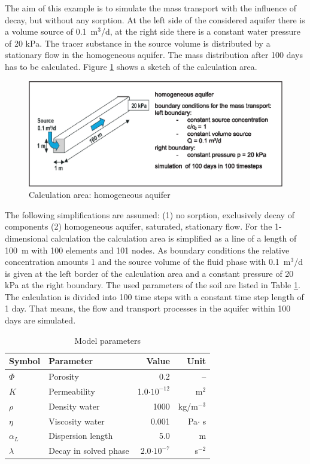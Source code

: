 The aim of this example is to simulate the mass transport with the influence of decay, but without any sorption. At the left side of the considered aquifer there is a volume source of 0.1~m$^3$/d, at the right side there is a constant water pressure of 20 kPa. The tracer substance in the source volume is distributed by a stationary flow in the homogeneous aquifer. The mass distribution after 100 days has to be calculated. Figure \ref{fig51} shows a sketch of the calculation area.

\begin{figure}[htbp]
\centering
\includegraphics[width=1.0\textwidth]{PART_II/C/fig51.eps}
\caption{Calculation area: homogeneous aquifer}
\label{fig51}
\end{figure}

The following simplifications are assumed: (1) no sorption, exclusively decay of components (2) homogeneous aquifer, saturated, stationary flow.
%
For the 1-dimensional calculation the calculation area is simplified as a line of a length of 100~m with 100 elements and 101 nodes. As boundary conditions the relative concentration amounts 1 and the source volume of the fluid phase with 0.1~m$^3$/d is given at the left border of the calculation area and a constant pressure of 20 kPa at the right boundary. The used parameters of the soil are listed in Table \ref{tab51}. The calculation is divided into 100 time steps with a constant time step length of 1 day. That means, the flow and transport processes in the aquifer within 100 days are simulated.

\begin{table}[h]%
\begin{center}
\begin{tabular}{llrr}
\toprule
Symbol & Parameter & Value & Unit \\
\midrule
$\Phi$ & Porosity & 0.2 & -- \\
$K$ & Permeability & 1.0$\cdot 10^{-12}$ & m$^2$ \\
$\rho$ & Density water & 1000 & kg/m$^{-3}$  \\		
$\eta$ & Viscosity water & 0.001 & Pa$\cdot$ s \\
$\alpha_L$ & Dispersion length & 5.0 & m \\
$\lambda$ & Decay in solved phase & 2.0$\cdot 10^{-7}$ & s$^{-2}$ \\
\bottomrule
\end{tabular}
\caption{Model parameters}
\label{tab51}
\end{center}
\end{table}

